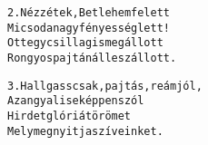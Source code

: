 \begin{minipage}{\textwidth}
\kottastart
{}
\kottaend
\begin{minipage}{\textwidth}
\begin{multicols}{2}
\begin{minipage}{\textwidth}
\begin{alltt}
2. Nézzétek, Betlehem felett
   Micsoda nagy fényesség lett!
   Ott egy csillag is megállott
   Rongyos pajtánál leszállott.
\end{alltt}
\vspace{0.0cm}
\versszakspacing
\end{minipage}
\begin{minipage}{\textwidth}
\begin{alltt}
3. Hallgass csak, pajtás, reám jól,
   Az angyal is eképpen szól
   Hirdet glóriát örömet
   Mely meg nyitja szíveinket.
\end{alltt}
\vspace{0.0cm}
\versszakspacing
\end{minipage}
\vspace{0.2cm}
\end{multicols}
\end{minipage}

\end{minipage}
~\vspace{1.0cm}
\newline
